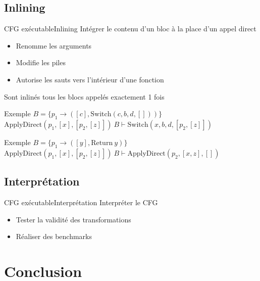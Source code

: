 \documentclass{beamer}
\begin{document}
\subsection{Inlining}

\begin{frame}{CFG exécutable}{Inlining}
    Intégrer le contenu d'un bloc à la place d'un appel direct

    \begin{itemize}
        \item Renomme les arguments
        \item Modifie les piles
        \item Autorise les sauts vers l'intérieur d'une fonction
    \end{itemize}

    Sont inlinés tous les blocs appelés exactement 1 fois


    \begin{exampleblock}{Exemple}
        $B = \lbrace p_1 \rightarrow ([c], \text{Switch}(c, b, d, [])) \rbrace$
        $\text{ApplyDirect}(p_1, [x], [p_2, [z]]) ~ B \vdash \text{Switch}(x, b, d, [p_2, [z]])$
    \end{exampleblock}

    \begin{exampleblock}{Exemple}
        $B = \lbrace p_1 \rightarrow ([y], \text{Return} ~ y) \rbrace$
        $\text{ApplyDirect}(p_1, [x], [p_2, [z]]) ~ B \vdash \text{ApplyDirect}(p_2, [x, z], [])$
    \end{exampleblock}
\end{frame}

\subsection{Interprétation}

\begin{frame}{CFG exécutable}{Interprétation}
    Interpréter le CFG

    \begin{itemize}
        \item Tester la validité des transformations
        \item Réaliser des benchmarks
    \end{itemize}
\end{frame}

\section{Conclusion}
\end{document}
